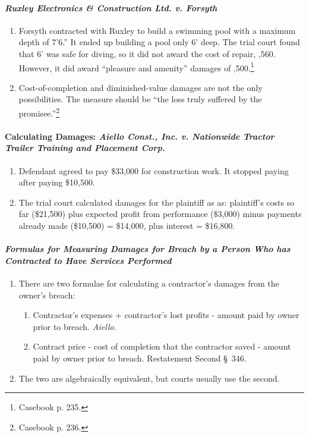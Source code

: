 \paragraph{\emph{Ruxley Electronics \& Construction Ltd. v. Forsyth}}

\begin{enumerate}
    \item Forsyth contracted with Ruxley to build a swimming pool with a 
    maximum depth of 7'6.'' It ended up building a pool only 6' deep. The 
    trial court found that 6' was safe for diving, so it did not award the 
    cost of repair, ,560. However, it did award ``pleasure 
    and amenity'' damages of ,500.\footnote{Casebook p. 235.}
    \item Cost-of-completion and diminished-value damages are not the only 
    possibilities. The measure should be ``the loss truly suffered by the 
    promisee.''\footnote{Casebook p. 236.}
\end{enumerate}

\paragraph{Calculating Damages: \emph{Aiello Const., Inc. v. Nationwide 
Tractor Trailer Training and Placement Corp.}}

\begin{enumerate}
    \item Defendant agreed to pay \$33,000 for construction work. It stopped 
    paying after paying \$10,500.
    \item The trial court calculated damages for the plaintiff as as: 
    plaintiff's costs so far (\$21,500) plus expected profit from performance 
    (\$3,000) minus payments already made (\$10,500) = \$14,000, plus interest 
    = \$16,800.
\end{enumerate}

\paragraph{\emph{Formulas for Measuring Damages for Breach by a Person Who has 
Contracted to Have Services Performed}}

\begin{enumerate}
    \item There are two formulae for calculating a contractor's damages from 
    the owner's breach:
    \begin{enumerate}
        \item Contractor's expenses + contractor's lost profits - amount paid 
        by owner prior to breach. \emph{Aiello.}
        \item Contract price - cost of completion that the contractor saved - 
        amount paid by owner prior to breach. Restatement Second \S\ 346.
    \end{enumerate}
    \item The two are algebraically equivalent, but courts usually use the 
    second.
\end{enumerate}

